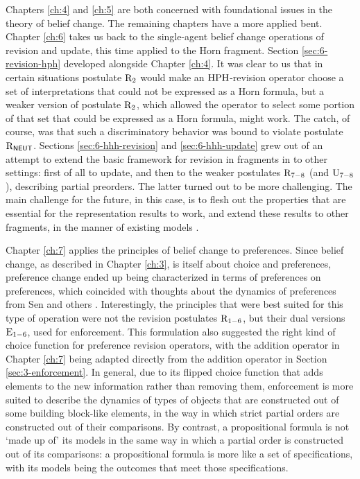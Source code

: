 Chapters \ref{ch:4} and \ref{ch:5} are both concerned with foundational issues in the theory of belief change.
The remaining chapters have a more applied bent.
Chapter \ref{ch:6} takes us back to the single-agent belief change operations of 
revision and update, this time applied to the Horn fragment. 
Section \ref{sec:6-revision-hph} developed alongside Chapter \ref{ch:4}.
It was clear to us that in certain situations postulate $\mathrm{R}_{2}$ would make an ${\mathrm{HPH}}$-revision operator
choose a set of interpretations that could not be expressed as a Horn formula,
but a weaker version of postulate $\mathrm{R}_{2}$, which allowed the operator to select some 
portion of that set that could be expressed as a Horn formula, might work.
The catch, of course, was that such a discriminatory behavior was bound 
to violate postulate $\mathrm{R}_{\mathsf{NEUT}}$.
Sections \ref{sec:6-hhh-revision} and \ref{sec:6-hhh-update} grew out of an attempt to extend 
the basic framework for revision in fragments in \cite{DelgrandeP15,DelgrandePW18} to other settings:
first of all to update, and then to the weaker postulates $\mathrm{R}_{7-8}$ (and $\mathrm{U}_{7-8}$),
describing partial preorders. The latter turned out to be more challenging.
The main challenge for the future, in this case, is to flesh out the properties that are essential 
for the representation results to work, and extend these results to other fragments,
in the manner of existing models \cite{DelgrandePW18}. 

Chapter \ref{ch:7} applies the principles of belief change to preferences.
Since belief change, as described in Chapter \ref{ch:3}, is itself about 
choice and preferences, preference change ended up being characterized in terms 
of preferences on preferences,
which coincided with thoughts about the dynamics of preferences from Sen and others \cite{Sen77}.
Interestingly, the principles that were best suited for this type of operation 
were not the revision postulates $\mathrm{R}_{1-6}$, but their dual versions $\mathrm{E}_{1-6}$,
used for enforcement.
This formulation also suggested the right kind of choice function for preference revision 
operators, with the addition operator in Chapter \ref{ch:7} being adapted directly 
from the addition operator in Section \ref{sec:3-enforcement}.
In general, due to its flipped choice function
that adds elements to the new information rather than removing them, 
enforcement is more suited to describe the dynamics of types of objects 
that are constructed out of some building block-like elements, in the way in which strict partial orders 
are constructed out of their comparisons.
By contrast, a propositional formula is not `made up of' its models in the same way in which
a partial order is constructed out of its comparisons:
a propositional formula is more like a set of specifications, with its models 
being the outcomes that meet those specifications.


